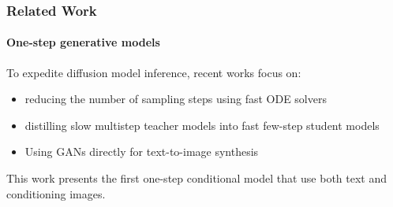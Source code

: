     \begin{frame}
    \frametitle{Related Work}
    \framesubtitle{One-step generative models}
    To expedite diffusion model inference, recent works focus on:
    \begin{itemize}
        \item reducing the number of sampling steps using fast ODE solvers \cite{karras2022elucidating, lu2022dpmsolver}
        \item distilling slow multistep teacher models into fast few-step student models \cite{meng2022sdedit, salimans2022progressive}
        \item Using GANs directly for text-to-image synthesis \cite{kang2023scaling, sauer2023stylegant}
    \end{itemize}
    
    This work presents the first one-step conditional model that use both text and conditioning images.
\end{frame}